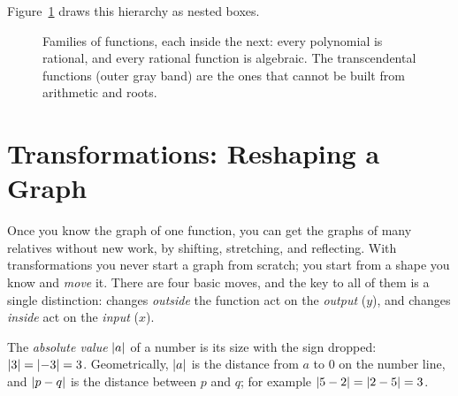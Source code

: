 Figure~\ref{ch02:fig-families} draws this hierarchy as nested boxes.

\begin{figure}[htbp]
\centering
{}
\caption{Families of functions, each inside the next: every polynomial is
rational, and every rational function is algebraic. The transcendental functions
(outer gray band) are the ones that cannot be built from arithmetic and roots.}
\label{ch02:fig-families}
\end{figure}

\section{Transformations: Reshaping a Graph}
\label{ch02:transformations}

Once you know the graph of one function, you can get the graphs of many relatives
without new work, by shifting, stretching, and reflecting. With
transformations you never start a graph from scratch; you start from a shape
you know and \emph{move} it. There are four basic moves, and the key to all of them
is a single distinction: changes \emph{outside} the function act on the
\emph{output} ($y$), and changes \emph{inside} act on the \emph{input} ($x$).

The \emph{absolute value} $\lvert a\rvert$ of a number is its size with the sign dropped:
$\lvert3\rvert=\lvert-3\rvert=3$. Geometrically, $\lvert a\rvert$ is the distance from $a$ to $0$ on the
number line, and $\lvert p-q\rvert$ is the distance between $p$ and $q$; for example
$\lvert5-2\rvert=\lvert2-5\rvert=3$.

